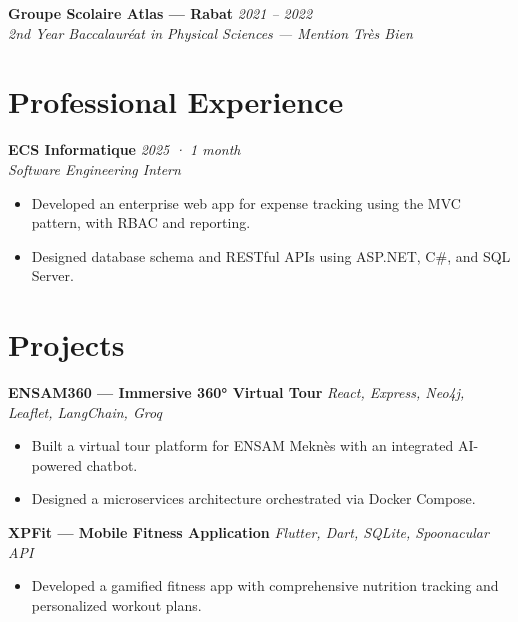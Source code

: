 \documentclass[a4paper,11pt]{article}
\newcommand{\entryhead}[3]{%
  \textbf{#1} \hfill \textit{#2} \\
  \textit{#3}
}
\begin{document}
\vspace{4pt}

\entryhead{Groupe Scolaire Atlas — Rabat}{2021 -- 2022}{2nd Year Baccalauréat in Physical Sciences — Mention Très Bien}

\section{Professional Experience}

\entryhead{ECS Informatique}{2025 · 1 month}{Software Engineering Intern}
\begin{itemize}[leftmargin=*, nosep, topsep=2pt]
  \item Developed an enterprise web app for expense tracking using the MVC pattern, with RBAC and reporting.
  \item Designed database schema and RESTful APIs using ASP.NET, C\#, and SQL Server.
\end{itemize}

\section{Projects}

\textbf{ENSAM360 — Immersive 360° Virtual Tour} \hfill \textit{React, Express, Neo4j, Leaflet, LangChain, Groq}
\begin{itemize}[leftmargin=*, nosep, topsep=2pt]
  \item Built a virtual tour platform for ENSAM Meknès with an integrated AI-powered chatbot.
  \item Designed a microservices architecture orchestrated via Docker Compose.
\end{itemize}

\vspace{4pt}

\textbf{XPFit — Mobile Fitness Application} \hfill \textit{Flutter, Dart, SQLite, Spoonacular API}
\begin{itemize}[leftmargin=*, nosep, topsep=2pt]
  \item Developed a gamified fitness app with comprehensive nutrition tracking and personalized workout plans.
\end{itemize}

\vspace{4pt}
\end{document}
